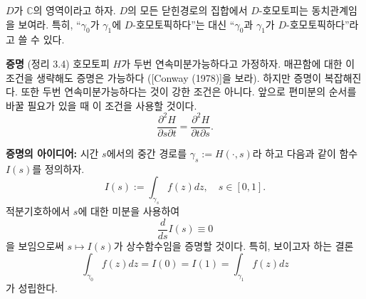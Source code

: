 \begin{salt_exercise} \label{ex-3-17}
$D$가 $\mathbb C$의 영역이라고 하자.
$D$의 모든 닫힌경로의 집합에서 $D$-호모토피는 동치관계임을 보여라.
특히, ``$\gamma_0$가 $\gamma_1$에 $D$-호모토픽하다''는 대신
``$\gamma_0$과 $\gamma_1$가 $D$-호모토픽하다''라고 쓸 수 있다.
\end{salt_exercise}

{\bf 증명} (정리 3.4)
호모토피 $H$가 두번 연속미분가능하다고 가정하자.
매끈함에 대한 이 조건을 생략해도 증명은 가능하다 ([Conway (1978)]을 보라). %
하지만 증명이 복잡해진다. 
또한 두번 연속미분가능하다는 것이 강한 조건은 아니다.
앞으로 편미분의 순서를 바꿀 필요가 있을 때 이 조건을 사용할 것이다.
\[
\dfrac{\partial^2 H}{\partial s \partial t} =\dfrac{\partial^2 H}{\partial t \partial s}.
\]

{\bf 증명의 아이디어:}
시간 $s$에서의 중간 경로를 $\gamma_s := H(\cdot, s)$라 하고
다음과 같이 함수 $I(s)$를 정의하자.
\[
I(s) := \int_{\gamma_s} f(z)dz, \quad s\in [0,1].
\]
적분기호하에서 $s$에 대한 미분을 사용하여
\[
\dfrac d{ds} I(s) \equiv 0
\]
을 보임으로써 $s\mapsto I(s)$가 상수함수임을 증명할 것이다.
특히, 보이고자 하는 결론
\[
\int_{\gamma_0} f(z)dz = I(0) = I(1) = \int_{\gamma_1} f(z)dz
\]
가 성립한다.

